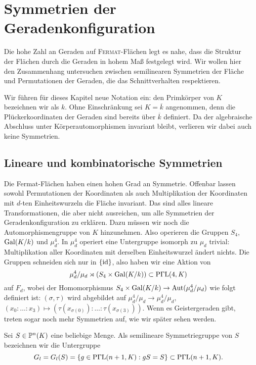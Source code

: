 \chapter{Symmetrien der Geradenkonfiguration} \label{chap:configsymm}
Die hohe Zahl an Geraden auf \textsc{Fermat}-Flächen legt es nahe, dass die Struktur der Flächen durch die Geraden in hohem Maß festgelegt wird. Wir wollen hier den Zusammenhang untersuchen zwischen semilinearen Symmetrien der Fläche und Permutationen der Geraden, die das Schnittverhalten respektieren.

Wir führen für dieses Kapitel neue Notation ein: den Primkörper von $K$ bezeichnen wir als $k$. Ohne Einschränkung sei $K = \overline k$ angenommen, denn die Plückerkoordinaten der Geraden sind bereits über $\overline k$ definiert. Da der algebraische Abschluss unter Körperautomorphismen invariant bleibt, verlieren wir dabei auch keine Symmetrien.

\section{Lineare und kombinatorische Symmetrien}
Die Fermat-Flächen haben einen hohen Grad an Symmetrie. Offenbar lassen sowohl Permutationen der Koordinaten als auch Multiplikation der Koordinaten mit $d$-ten Einheitswurzeln die Fläche invariant. Das sind alles lineare Transformationen, die aber nicht ausreichen, um alle Symmetrien der Geradenkonfiguration zu erklären. Dazu müssen wir noch die Automorphismengruppe von $K$ hinzunehmen. Also operieren die Gruppen $S_4$, $\Gal K/k$ und $\mu_d^4$. In $\mu_d^4$ operiert eine Untergruppe isomorph zu $\mu_d$ trivial: Multiplikation aller Koordinaten mit derselben Einheitswurzel ändert nichts. Die Gruppen schneiden sich nur in $\{\operatorname{id}\}$, also haben wir eine Aktion von
\begin{equation}
\mu_d^4 / \mu_d \rtimes (S_4 \times \Gal K/k) \subset \PGaL 4K
\end{equation}
auf $F_d$, wobei der Homomorphismus $S_4 \times \Gal K/k \rightarrow \Aut(\mu_d^4 / \mu_d)$ wie folgt definiert ist: $(\sigma, \tau)$ wird abgebildet auf $\mu_d^4 / \mu_d \to \mu_d^4 / \mu_d$, $(x_0:\dots:x_3) \mapsto (\tau(x_{\sigma(0)}):\dots:\tau(x_{\sigma(3)}))$. Wenn es Geistergeraden gibt, treten sogar noch mehr Symmetrien auf, wie wir später sehen werden.

\begin{defin}
Sei $S \in \mathbb P^{n}(K)$ eine beliebige Menge. Als semilineare Symmetriegruppe von $S$ bezeichnen wir die Untergruppe
\begin{equation}
G_l = G_l(S) = \{ g \in \mathrm{P\Gamma L}(n+1,K): gS = S \} \subset \mathrm{P\Gamma L}(n+1,K).
\end{equation}
\end{defin}

